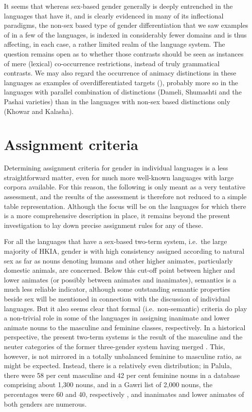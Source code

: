 \documentclass[output=collectionpaper]{langsci/langscibook}
\begin{document}
It seems that whereas sex-based gender generally is deeply entrenched in the languages that have it, and is clearly evidenced in many of its inflectional paradigms, the non-sex based type of gender differentiation that we saw examples of in a few of the languages, is indexed in considerably fewer domains and is thus affecting, in each case, a rather limited realm of the language system. The question remains open as to whether those contrasts should be seen as instances of mere (lexical) co-occurrence restrictions, instead of truly grammatical contrasts. We may also regard the occurrence of animacy distinctions in these languages as examples of overdifferentiated targets (\citealt[168--169]{Corbett1991}), probably more so in the languages with parallel combination of distinctions (Dameli, Shumashti and the Pashai varieties) than in the languages with non-sex based distinctions only (Khowar and Kalasha).

\section{Assignment criteria}
\label{sec:Lilje:6}

Determining assignment criteria for gender in individual languages is a less straightforward matter, even for much more well-known languages with large corpora available. For this reason, the following is only meant as a very tentative assessment, and the results of the assessment is therefore not reduced to a simple table representation. Although the focus will be on the languages for which there is a more comprehensive description in place, it remains beyond the present investigation to lay down precise assignment rules for any of these.

For all the languages that have a sex-based two-term system, i.e.\ the large majority of HKIA, gender is with high consistency assigned according to natural sex as far as nouns denoting humans and other higher animates, particularly domestic animals, are concerned. Below this cut-off point between higher and lower animates (or possibly between animates and inanimates), semantics is a much less reliable indicator, although some outstanding semantic properties beside sex will be mentioned in connection with the discussion of individual languages. But it also seems clear that formal (i.e.\ non-semantic) criteria do play a non-trivial role in some of the languages in assigning inanimate and lower animate nouns to the masculine and feminine classes, respectively. In a historical perspective, the present two-term systems is the result of the masculine and the neuter categories of the former three-gender system having merged \citep[221]{Masica1991}. This, however, is not mirrored in a totally unbalanced feminine to masculine ratio, as might be expected. Instead, there is a relatively even distribution; in Palula, there were 58 per cent masculine and 42 per cent feminine nouns in a database comprising about 1,300 nouns, and in a Gawri list of 2,000 nouns, the percentages were 60 and 40, respectively \citep[82]{Baart1999}, and inanimates and lower animates of both genders are numerous.
\end{document}
